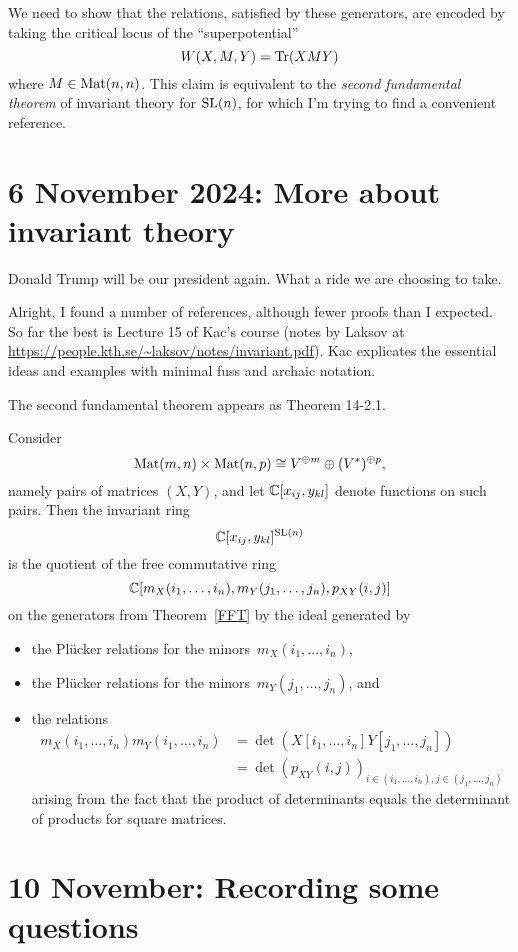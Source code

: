 \documentclass[11pt]{amsart}
\begin{document}
We need to show that the relations, satisfied by these generators, are encoded by taking the critical locus of the ``superpotential''
\[
W(X,M,Y) = \operatorname{Tr}(XMY)
\]
where $M \in \operatorname{Mat}(n,n)$.
This claim is equivalent to the {\em second fundamental theorem} of invariant theory for $\operatorname{SL}(n)$,
for which I'm trying to find a convenient reference.

\section{6 November 2024: More about invariant theory}

Donald Trump will be our president again.
What a ride we are choosing to take.

Alright, I found a number of references, although fewer proofs than I expected.
So far the best is Lecture 15 of Kac's course (notes by Laksov at \url{https://people.kth.se/~laksov/notes/invariant.pdf}).
Kac explicates the essential ideas and examples with minimal fuss and archaic notation.

The second fundamental theorem appears as Theorem 14-2.1.

\begin{thm}
Consider 
\[
\operatorname{Mat}(m,n) \times \operatorname{Mat}(n,p)\cong V^{\oplus m} \oplus (V^*)^{\oplus p},
\]
namely pairs of matrices $(X,Y)$, and let $\mathbb C[x_{ij}, y_{kl}]$ denote functions on such pairs.
Then the invariant ring
\[
\mathbb C[x_{ij}, y_{kl}]^{\operatorname{SL}(n)}
\]
is the quotient of the free commutative ring 
\[
\mathbb C[m_X(i_1,\ldots, i_n), m_Y(j_1,\ldots, j_n), p_{XY}(i,j)]
\]
on the generators from Theorem~\ref{FFT}
by the ideal generated by
\begin{itemize}
\item the Pl\"ucker relations for the minors~$m_X(i_1,\ldots, i_n)$,
\item the Pl\"ucker relations for the minors~$m_Y(j_1,\ldots, j_n)$, and
\item the relations
\begin{align*}
m_X(i_1,\ldots, i_n)m_Y(i_1,\ldots, i_n) 
&= \det(X[i_1,\ldots,i_n]Y[j_1,\ldots,j_n]) \\
&= \det(p_{XY}(i,j))_{i \in (i_1,\ldots, i_n), j \in (j_1,\ldots, j_n)}
\end{align*}
arising from the fact that the product of determinants equals the determinant of products for square matrices.
\end{itemize}
\end{thm}

\section{10 November: Recording some questions}
\end{document}

